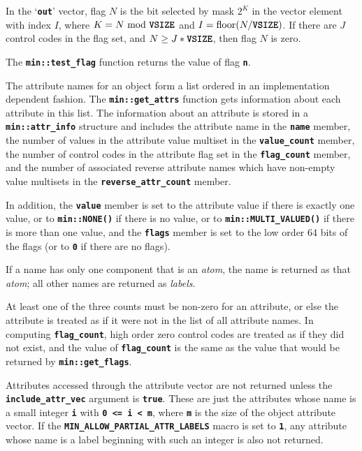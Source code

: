 \documentclass[12pt]{article}
\newcommand{\TT}[1]{{\tt \bfseries #1}}
\newcommand{\EOL}{\penalty \exhyphenpenalty}
\begin{document}
In the `\TT{out}' vector, flag $N$ is the bit selected by mask $2^K$
in the vector element with index $I$, where $K=N~\mbox{mod}~\mbox{\TT{VSIZE}}$
and $I=\mbox{floor}(N/\mbox{\TT{VSIZE}})$.
If there are $J$ control codes
in the flag set, and $N\geq J*\mbox{\TT{VSIZE}}$, then
flag $N$ is zero.

The \TT{min::\EOL test\_\EOL flag} function returns the value
of flag \TT{n}.

The attribute names for an object form a list ordered in an implementation
dependent fashion.  
The \TT{min::\EOL get\_\EOL attrs} function gets information about each
attribute in this list.  The information about an attribute is stored in a
\TT{min::\EOL attr\_\EOL info} structure and includes the attribute
name in the \TT{name} member,
the number of values in the attribute value multiset in the \TT{value\_count}
member, the number of control codes in the attribute flag set in
the \TT{flag\_count} member, and the number of associated
reverse attribute names which have non-empty value multisets in the
\TT{reverse\_attr\_count} member.

In addition, the \TT{value} member is set to the attribute value if there
is exactly one value, or to \TT{min::\EOL NONE()} if there is no value,
or to \TT{min::\EOL MULTI\_\EOL VALUED()} if there is more than one value,
and the \TT{flags} member is set to the low order 64 bits of the flags
(or to \TT{0} if there are no flags).

If a name has only one component that is an {\em atom}, the name is returned
as that {\em atom}; all other names are returned as {\em labels}.

At least one of the three counts must be
non-zero for an attribute, or else the attribute is treated as if it
were not in the list of all attribute names.  In computing
\TT{flag\_count}, high order zero control codes are treated as if they
did not exist, and the value of \TT{flag\_count} is the
same as the value that would be returned by \TT{min::\EOL get\_\EOL flags}.

Attributes accessed through the attribute vector are not returned unless
the \TT{include\_\EOL attr\_\EOL vec} argument is \TT{true}.  These are
just the attributes whose name is a small integer
\TT{i} with \TT{0 <= i < m}, where \TT{m} is the size of the object
attribute vector.
If the \TT{MIN\_\EOL ALLOW\_\EOL PARTIAL\_\EOL ATTR\_\EOL LABELS}
macro is set to \TT{1}, any attribute whose name is a label beginning
with such an integer is also not returned.
\end{document}

